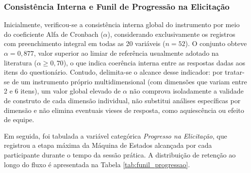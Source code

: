 \subsubsection*{Consistência Interna e Funil de Progressão na Elicitação}

Inicialmente, verificou-se a consistência interna global do instrumento por meio do coeficiente Alfa de Cronbach ($\alpha$), considerando exclusivamente os registros com preenchimento integral em todas as 20 variáveis ($n = 52$). O conjunto obteve \textbf{$\alpha = 0,877$}, valor superior ao limiar de referência usualmente adotado na literatura ($\alpha \ge 0,70$), o que indica coerência interna entre as respostas dadas aos itens do questionário. Contudo, delimita-se o alcance desse indicador: por tratar-se de um instrumento próprio multidimensional (com dimensões que variam entre 2 e 6 itens), um valor global elevado de $\alpha$ não comprova isoladamente a validade de construto de cada dimensão individual, não substitui análises específicas por dimensão e não elimina eventuais vieses de resposta, como aquiescência ou efeito de equipe.

Em seguida, foi tabulada a variável categórica \textit{Progresso na Elicitação}, que registrou a etapa máxima da Máquina de Estados alcançada por cada participante durante o tempo da sessão prática. A distribuição de retenção ao longo do fluxo é apresentada na Tabela \ref{tab:funil_progressao}.

